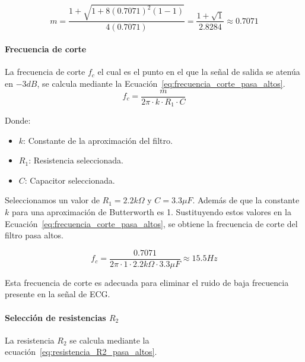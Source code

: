         \begin{equation}
            \label{eq:factor_m_pasa_altos_valor}
            m = \frac{1+\sqrt{1+8(0.7071)^2(1-1)}}{4(0.7071)} = \frac{1 + \sqrt{1}}{2.8284}\approx 0.7071
        \end{equation}

        \paragraph{Frecuencia de corte}
        La frecuencia de corte $f_c$ el cual es el punto en el que la señal de salida se atenúa en $-3 dB$, se calcula mediante la Ecuación~\ref{eq:frecuencia_corte_pasa_altos}.
        \begin{equation}
            \label{eq:frecuencia_corte_pasa_altos}
            f_c = \frac{m}{2\pi \cdot k \cdot R_1 \cdot C}
        \end{equation}

        Donde:

        \begin{itemize}
            \item $k$: Constante de la aproximación del filtro.
            \item $R_1$: Resistencia seleccionada.
            \item $C$: Capacitor seleccionada.
        \end{itemize}

        Seleccionamos un valor de $R_1 = 2.2 k\Omega$ y $C = 3.3 \mu F$. Además de que la constante $k$ para una aproximación de Butterworth es 1. Sustituyendo estos valores en la Ecuación~\ref{eq:frecuencia_corte_pasa_altos}, se obtiene la frecuencia de corte del filtro pasa altos.

        \begin{equation}
            \label{eq:frecuencia_corte_pasa_altos_valor}
            f_c = \frac{0.7071}{2\pi \cdot 1 \cdot 2.2 k\Omega \cdot 3.3 \mu F} \approx 15.5 Hz
        \end{equation}

        Esta frecuencia de corte es adecuada para eliminar el ruido de baja frecuencia presente en la señal de ECG.

        \paragraph{Selección de resistencias $R_2$}
        La resistencia $R_2$ se calcula mediante la ecuación~\ref{eq:resistencia_R2_pasa_altos}.

